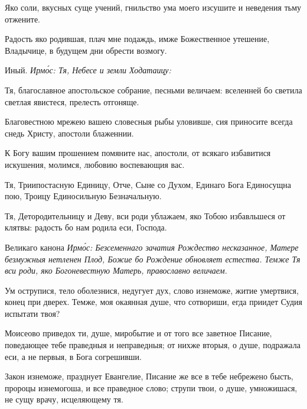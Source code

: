 
Яко соли, вкусных суще учений, гнильство ума моего изсушите и неведения тьму отжените.


Радость яко родившая, плач мне подаждь, имже Божественное утешение, Владычице, в будущем дни обрести возмогу.

Иный. \itshape Ирм\'{о}с\normalfont{}: Тя, Небесе и земли Ходатаицу:


Тя, благославное апостольское собрание, песньми величаем: вселенней бо светила светлая явистеся, прелесть отгоняще.


Благовестною мрежею вашею словесныя рыбы уловивше, сия приносите всегда снедь Христу, апостоли блаженнии.


К Богу вашим прошением помяните нас, апостоли, от всякаго избавитися искушения, молимся, любовию воспевающия вас.


Тя, Триипостасную Единицу, Отче, Сыне со Духом, Единаго Бога Единосущна пою, Троицу Единосильную Безначальную.


Тя, Детородительницу и Деву, вси роди ублажаем, яко Тобою избавльшеся от клятвы: радость бо нам родила еси, Господа.

Великаго канона \itshape Ирм\'{о}с\normalfont{}: Безсеменнаго зачатия Рождество несказанное, Матере безмужныя нетленен Плод, Божие бо Рождение обновляет естества. Темже Тя вси роди, яко Богоневестную Матерь, православно величаем.

Ум острупися, тело оболезнися, недугует дух, слово изнеможе, житие умертвися, конец при дверех. Темже, моя окаянная душе, что сотвориши, егда приидет Судия испытати твоя?

Моисеово приведох ти, душе, миробытие и от того все заветное Писание, поведающее тебе праведныя и неправедныя; от нихже вторыя, о душе, подражала еси, а не первыя, в Бога согрешивши.

Закон изнеможе, празднует Евангелие, Писание же все в тебе небрежено бысть, пророцы изнемогоша, и все праведное слово; струпи твои, о душе, умножишася, не сущу врачу, исцеляющему тя.

